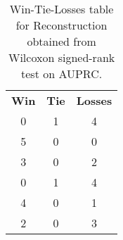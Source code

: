 \begin{table}
\centering
\caption{Win-Tie-Losses table for Reconstruction obtained from Wilcoxon signed-rank test on AUPRC.}
\label{tab:reconstruction_model_comparison_AUPRC}
\begin{tabular}{|c|c|c|}
\toprule
 \textbf{Win} &  \textbf{Tie} &  \textbf{Losses} \\
            0 &             1 &                4 \\
\midrule
            5 &             0 &                0 \\
            3 &             0 &                2 \\
            0 &             1 &                4 \\
            4 &             0 &                1 \\
            2 &             0 &                3 \\
\bottomrule
\end{tabular}
\end{table}

